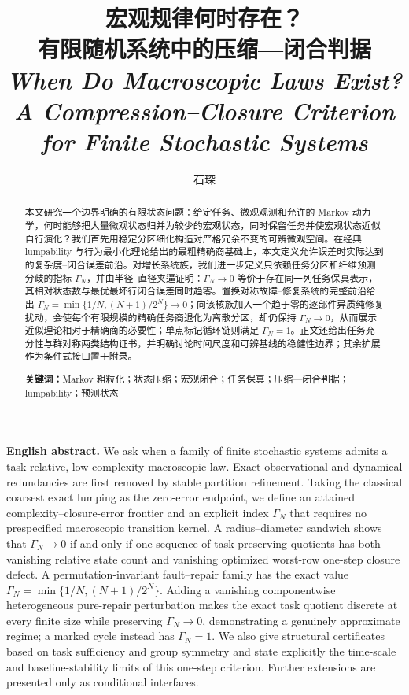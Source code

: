 \documentclass[UTF8,fontset=fandol,11pt,a4paper]{ctexart}
\title{\bfseries 宏观规律何时存在？\\[0.35em]
\Large 有限随机系统中的压缩—闭合判据\\[0.8em]
\normalsize \textit{When Do Macroscopic Laws Exist? A Compression--Closure Criterion for Finite Stochastic Systems}}
\author{石琛}
\date{}
\begin{document}
\maketitle

\begin{abstract}
本文研究一个边界明确的有限状态问题：给定任务、微观观测和允许的 Markov 动力学，何时能够把大量微观状态归并为较少的宏观状态，同时保留任务并使宏观状态近似自行演化？我们首先用稳定分区细化构造对严格冗余不变的可辨微观空间。在经典 lumpability 与行为最小化理论给出的最粗精确商基础上，本文定义允许误差时实际达到的复杂度--闭合误差前沿。对增长系统族，我们进一步定义只依赖任务分区和纤维预测分歧的指标 $\Gamma_N$，并由半径--直径夹逼证明：$\Gamma_N\to0$ 等价于存在同一列任务保真表示，其相对状态数与最优最坏行闭合误差同时趋零。置换对称故障--修复系统的完整前沿给出 $\Gamma_N=\min\{1/N,(N+1)/2^N\}\to0$；向该核族加入一个趋于零的逐部件异质纯修复扰动，会使每个有限规模的精确任务商退化为离散分区，却仍保持 $\Gamma_N\to0$，从而展示近似理论相对于精确商的必要性；单点标记循环链则满足 $\Gamma_N=1$。正文还给出任务充分性与群对称两类结构证书，并明确讨论时间尺度和可辨基线的稳健性边界；其余扩展作为条件式接口置于附录。

\medskip
\noindent\textbf{关键词：}Markov 粗粒化；状态压缩；宏观闭合；任务保真；压缩—闭合判据；lumpability；预测状态
\end{abstract}

\begin{center}
\begin{minipage}{0.94\textwidth}
\small
\textbf{English abstract.}
We ask when a family of finite stochastic systems admits a task-relative, low-complexity macroscopic law. Exact observational and dynamical redundancies are first removed by stable partition refinement. Taking the classical coarsest exact lumping as the zero-error endpoint, we define an attained complexity--closure-error frontier and an explicit index $\Gamma_N$ that requires no prespecified macroscopic transition kernel. A radius--diameter sandwich shows that $\Gamma_N\to0$ if and only if one sequence of task-preserving quotients has both vanishing relative state count and vanishing optimized worst-row one-step closure defect. A permutation-invariant fault--repair family has the exact value $\Gamma_N=\min\{1/N,(N+1)/2^N\}$. Adding a vanishing componentwise heterogeneous pure-repair perturbation makes the exact task quotient discrete at every finite size while preserving $\Gamma_N\to0$, demonstrating a genuinely approximate regime; a marked cycle instead has $\Gamma_N=1$. We also give structural certificates based on task sufficiency and group symmetry and state explicitly the time-scale and baseline-stability limits of this one-step criterion. Further extensions are presented only as conditional interfaces.
\end{minipage}
\end{center}
\end{document}
